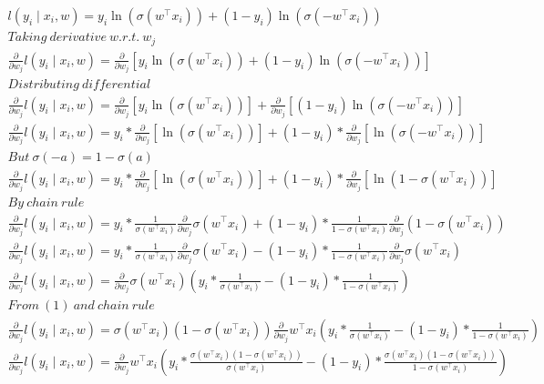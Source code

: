 \documentclass[11pt]{scrartcl}
\begin{document}
	\begin{gather*}
	l(y_i\mid x_i,w) = y_i \ln(\sigma(w^\intercal x_i)) + (1 - y_i)\ln(\sigma(-w^\intercal x_i))\\
	Taking\ derivative\ w.r.t.\ w_j\\
	\frac{\partial }{\partial w_j}l(y_i\mid x_i,w) = \frac{\partial }{\partial w_j}[y_i \ln(\sigma(w^\intercal x_i)) + (1 - y_i)\ln(\sigma(-w^\intercal x_i))]\\
	Distributing\ differential\\
	\frac{\partial }{\partial w_j}l(y_i\mid x_i,w) = \frac{\partial }{\partial w_j}[y_i \ln(\sigma(w^\intercal x_i))] + \frac{\partial }{\partial w_j}[(1 - y_i)\ln(\sigma(-w^\intercal x_i))]\\
	\frac{\partial }{\partial w_j}l(y_i\mid x_i,w) = y_i*\frac{\partial }{\partial w_j}[ \ln(\sigma(w^\intercal x_i))] + (1 - y_i)*\frac{\partial }{\partial w_j}[\ln(\sigma(-w^\intercal x_i))]\\
	But\ \sigma(-a) = 1-\sigma(a)\\
	\frac{\partial }{\partial w_j}l(y_i\mid x_i,w) = y_i*\frac{\partial }{\partial w_j}[ \ln(\sigma(w^\intercal x_i))] + (1 - y_i)*\frac{\partial }{\partial w_j}[\ln(1 - \sigma(w^\intercal x_i))]\\
	By\ chain\ rule\\
	\frac{\partial }{\partial w_j}l(y_i\mid x_i,w) = y_i*\frac{1}{\sigma(w^\intercal x_i)} \frac{\partial }{\partial w_j}\sigma(w^\intercal x_i) + (1 - y_i)*\frac{1}{1-\sigma(w^\intercal x_i)} \frac{\partial }{\partial w_j}(1-\sigma(w^\intercal x_i))\\
	\frac{\partial }{\partial w_j}l(y_i\mid x_i,w) = y_i*\frac{1}{\sigma(w^\intercal x_i)} \frac{\partial }{\partial w_j}\sigma(w^\intercal x_i) - (1 - y_i)*\frac{1}{1-\sigma(w^\intercal x_i)} \frac{\partial }{\partial w_j}\sigma(w^\intercal x_i)\\
	\frac{\partial }{\partial w_j}l(y_i\mid x_i,w) = \frac{\partial }{\partial w_j}\sigma(w^\intercal x_i)(y_i*\frac{1}{\sigma(w^\intercal x_i)} - (1 - y_i)*\frac{1}{1-\sigma(w^\intercal x_i)})\\
	From\ (1)\ and\ chain\ rule\\
	\frac{\partial }{\partial w_j}l(y_i\mid x_i,w) = \sigma(w^\intercal x_i)(1-\sigma(w^\intercal x_i))\frac{\partial }{\partial w_j}w^\intercal x_i(y_i*\frac{1}{\sigma(w^\intercal x_i)} - (1 - y_i)*\frac{1}{1-\sigma(w^\intercal x_i)})\\
	\frac{\partial }{\partial w_j}l(y_i\mid x_i,w) = \frac{\partial }{\partial w_j}w^\intercal x_i(y_i*\frac{\sigma(w^\intercal x_i)(1-\sigma(w^\intercal x_i))}{\sigma(w^\intercal x_i)} - (1 - y_i)*\frac{\sigma(w^\intercal x_i)(1-\sigma(w^\intercal x_i))}{1-\sigma(w^\intercal x_i)})\\

\end{gather*}
\end{document}
